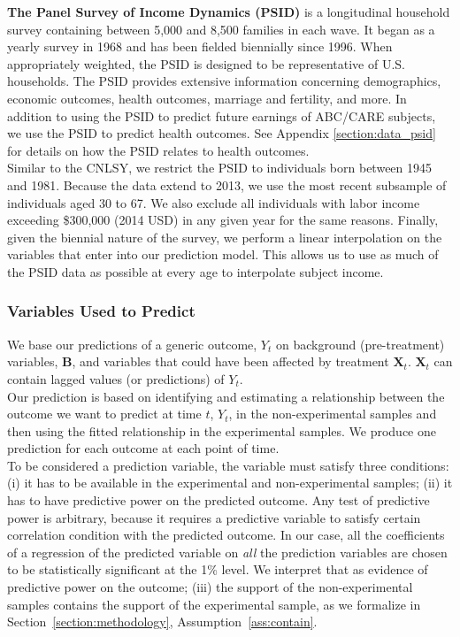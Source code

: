 \noindent \textbf{The Panel Survey of Income Dynamics (PSID)} is a longitudinal household survey containing between 5,000 and 8,500 families in each wave. It began as a yearly survey in 1968 and has been fielded biennially since 1996. When appropriately weighted, the PSID is designed to be representative of U.S. households. The PSID provides extensive information concerning demographics, economic outcomes, health outcomes, marriage and fertility, and more. In addition to using the PSID to predict future earnings of ABC/CARE subjects, we use the PSID to predict health outcomes. See Appendix \ref{section:data_psid} for details on how the PSID relates to health outcomes. \\

\noindent Similar to the CNLSY, we restrict the PSID to individuals born between 1945 and 1981. Because the data extend to 2013, we use the most recent subsample of individuals aged 30 to 67. We also exclude all individuals with labor income exceeding \$300,000 (2014 USD) in any given year for the same reasons. Finally, given the biennial nature of the survey, we perform a linear interpolation on the variables that enter into our prediction model. This allows us to use as much of the PSID data as possible at every age to interpolate subject income. \\

\subsubsection{Variables Used to Predict}

\noindent We base our predictions of a generic outcome, $Y_{t}$ on background (pre-treatment) variables, $\bm{B}$, and variables that could have been affected by treatment $\bm{X}_{t}$. $\bm{X}_{t}$ can contain lagged values (or predictions) of $Y_{t}$.\\

\noindent Our prediction is based on identifying and estimating a relationship between the outcome we want to predict at time $t$, $Y_{t}$, in the non-experimental samples and then using the fitted relationship in the experimental samples. We produce one prediction for each outcome at each point of time. \\

\noindent To be considered a prediction variable, the variable must satisfy three conditions: (i) it has to be available in the experimental and non-experimental samples; (ii) it has to have predictive power on the predicted outcome. Any test of predictive power is arbitrary, because it requires a predictive variable to satisfy certain correlation condition with the predicted outcome. In our case, all the coefficients of a regression of the predicted variable on \textit{all} the prediction variables are chosen to be statistically significant at the 1\% level. We interpret that as evidence of predictive power on the outcome; (iii) the support of the non-experimental samples contains the support of the experimental sample, as we formalize in  Section~\ref{section:methodology},  Assumption~\ref{ass:contain}.\\

